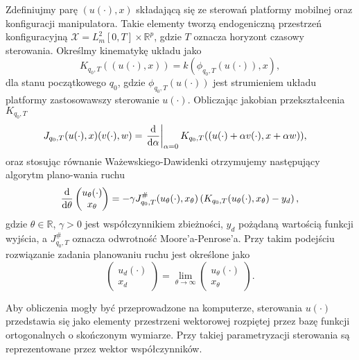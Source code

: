 Zdefiniujmy parę $(u(\cdot), x)$ składającą się ze sterowań platformy mobilnej oraz konfiguracji manipulatora. Takie elementy tworzą endogeniczną przestrzeń konfiguracyjną $\mathcal{X} = L_m^2[0, T] \times \mathbb{R}^p$, gdzie $T$ oznacza horyzont czasowy sterowania. Określmy kinematykę układu jako
\begin{equation}
K_{q_0, T}((u(\cdot), x)) = k(\phi_{q_0, T}(u(\cdot)), x),
\end{equation} dla stanu początkowego $q_0$, gdzie $\phi_{q_0, T}(u(\cdot))$ jest strumieniem układu platformy zastosowawszy sterowanie $u(\cdot)$. Obliczając jakobian przekształcenia $K_{q_0, T}$
\begin{align}
J_{q_0, T}(u(\cdot), x)(v(\cdot), w) &= \left.\frac{\mathrm{d}}{\mathrm{d} \alpha}\right|_{\alpha=0} K_{q_0, T}((u(\cdot)+\alpha v(\cdot), x+\alpha w)),
\end{align}
oraz stosując równanie Ważewskiego-Dawidenki otrzymujemy następujący algorytm plano-wania ruchu
\begin{equation}
\dfrac{\mathrm{d}}{\mathrm{d} \theta}\begin{pmatrix}
u_\theta(\cdot)\\ x_\theta
\end{pmatrix}=-\gamma J^\#_{q_0, T}(u_\theta(\cdot), x_\theta)\left( K_{q_0, T}(u_\theta(\cdot), x_\theta)-y_d\right),
\end{equation}
gdzie $\theta\in\mathbb{R}$, $\gamma>0$ jest współczynnikiem zbieżności, $y_d$ pożądaną wartością funkcji wyjścia, a $J^\#_{q_0, T}$ oznacza odwrotność Moore'a-Penrose'a. Przy takim podejściu rozwiązanie zadania planowaniu ruchu jest określone jako
\begin{equation}
\begin{pmatrix}
u_d(\cdot)\\ x_d
\end{pmatrix}=\lim_{\theta\rightarrow\infty}\begin{pmatrix}
u_\theta(\cdot)\\ x_\theta
\end{pmatrix}.
\end{equation}

Aby obliczenia mogły być przeprowadzone na komputerze, sterowania $u(\cdot)$ przedstawia się jako elementy przestrzeni wektorowej rozpiętej przez bazę funkcji ortogonalnych o skończonym wymiarze. Przy takiej parametryzacji sterowania są reprezentowane przez wektor współczynników. 

